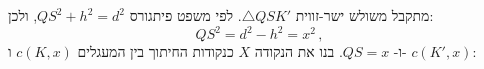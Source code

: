 %

מתקבל משולש ישר-זווית
$\triangle QSK'$.
לפי משפט פיתגורס
$QS^2 + h^2 = d^2$,
ולכן:
\[
QS^2 = d^2 - h^2 = x^2\,,
\]
ו-%
$QS = x$.
בנו את הנקודה
$X$
כנקודות החיתוך בין המעגלים
$c(K,x)$
ו-%
$c(K',x)$:

